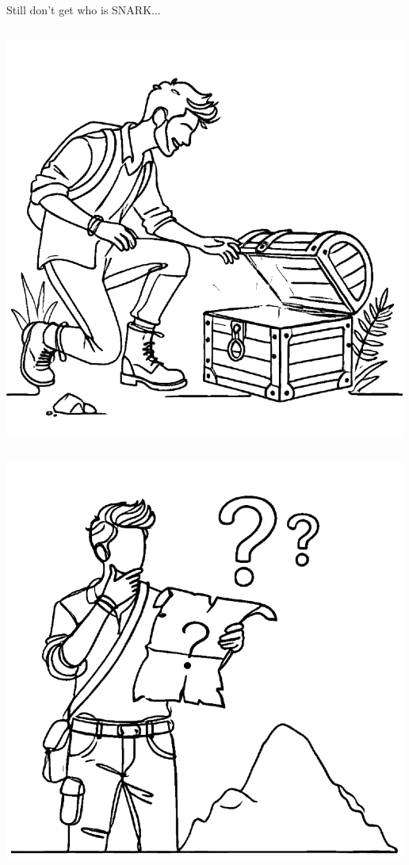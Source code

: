 \documentclass{zkdl-presentation-template}
\begin{document}
\begin{frame}{Still don't get who is SNARK...}
\begin{columns}
            \begin{column}{0.2\textwidth}
                \includegraphics[width=\linewidth]{../presentations/images/lecture_8/uvefoundtreasure.png}
            \end{column}
        \end{columns}

        \pause

        \begin{columns}
            \begin{column}{0.2\textwidth}
                \includegraphics[width=\linewidth]{../presentations/images/lecture_8/howtomakeaproof.png}
            \end{column}


\end{columns}
\end{frame}
\end{document}
